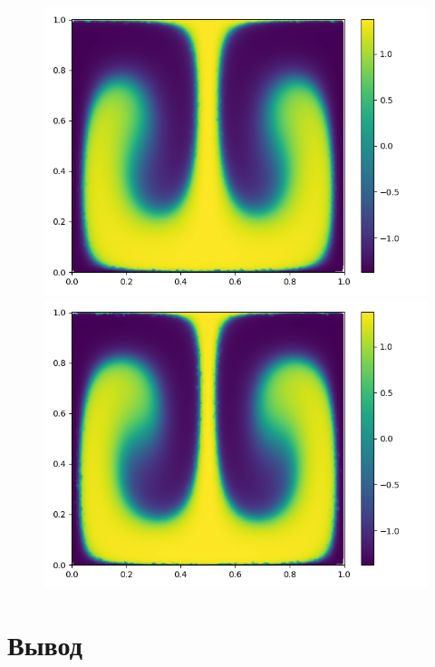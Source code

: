 \documentclass[a4paper, 14pt]{extarticle}
\begin{document}
		\begin{figure}[H]
			\begin{minipage}{0.5\textwidth}
				\centering
				\includegraphics[width = \linewidth]{9.png}
			\end{minipage}\hfill
			\begin{minipage}{0.5\textwidth}
				\centering
				\includegraphics[width = \linewidth]{10.png}
			\end{minipage}\hfill
		\end{figure}
		
	\section{Вывод}
		
\end{document}
